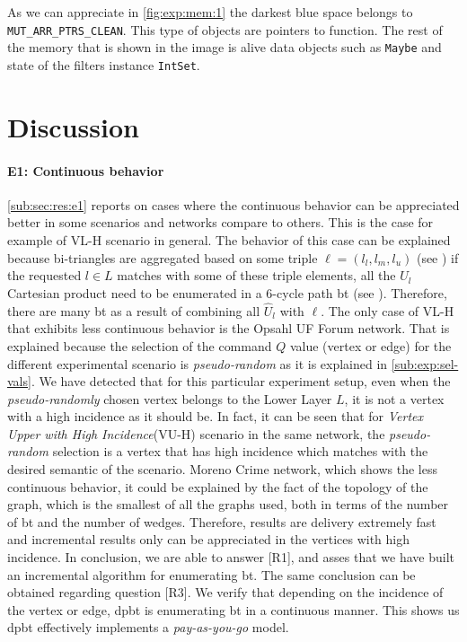 As we can appreciate in \autoref{fig:exp:mem:1} the darkest blue space belongs to \texttt{MUT\_ARR\_PTRS\_CLEAN}. This type of objects are pointers to function.
The rest of the memory that is shown in the image is alive data objects such as \texttt{Maybe} and state of the filters instance \texttt{IntSet}. 

\section{Discussion}\label{sec:exp:discussion}
\paragraph{E1: Continuous behavior} \autoref{sub:sec:res:e1} reports on cases where the continuous behavior can be appreciated better in some scenarios and networks compare to others. This is the case for example of VL-H scenario in general. 
The behavior of this case can be explained because bi-triangles are aggregated based on some triple $\ell = (l_l,l_m,l_u)$ (see ) if the requested $l \in L$ matches with some of these triple elements, all the $\hat{U}_l$ Cartesian product need to be enumerated in a 6-cycle path \acrshort{bt} (see ). Therefore, there are many \acrshort{bt} as a result of combining all $\hat{U}_l$ with $\ell$.
The only case of VL-H that exhibits less continuous behavior is the Opsahl UF Forum network. That is explained because the selection of the command $Q$ value (vertex or edge) for the different experimental scenario is \emph{pseudo-random} as it is explained in \autoref{sub:exp:sel-vals}. 
We have detected that for this particular experiment setup, even when the \emph{pseudo-randomly} chosen vertex belongs to the Lower Layer $L$, it is not a vertex with a high incidence as it should be.
In fact, it can be seen that for \emph{Vertex Upper with High Incidence}(VU-H) scenario in the same network, the \emph{pseudo-random} selection is a vertex that has high incidence which matches with the desired semantic of the scenario. 
Moreno Crime network, which shows the less continuous behavior, it could be explained by the fact of the topology of the graph, which is the smallest of all the graphs used, both in terms of the number of \acrshort{bt} and the number of wedges.
Therefore, results are delivery extremely fast and incremental results only can be appreciated in the vertices with high incidence.
In conclusion, we are able to answer [R1], and asses that we have built an incremental algorithm for enumerating \acrlong{bt}. 
The same conclusion can be obtained regarding question [R3]. We verify that depending on the incidence of the vertex or edge, \acrshort{dpbt} is enumerating \acrshort{bt} in a continuous manner. This shows us \acrshort{dpbt} effectively implements a \emph{pay-as-you-go} model.

